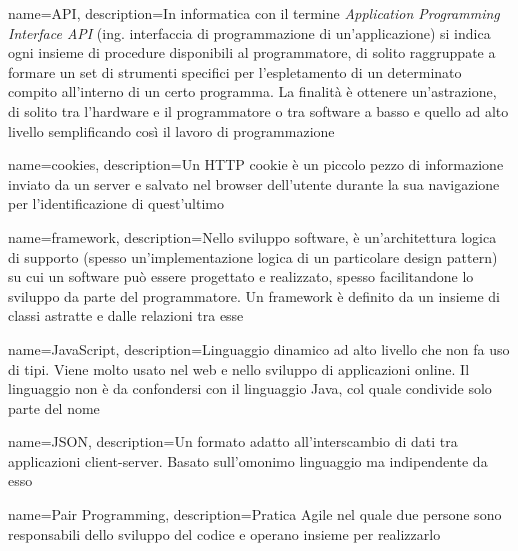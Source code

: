 
\renewcommand{\acronymname}{Acronimi e abbreviazioni}



{
    name=API,
    description={In informatica con il termine \emph{Application Programming Interface API} (ing. interfaccia di programmazione di un'applicazione) si indica ogni insieme di procedure disponibili al programmatore, di solito raggruppate a formare un set di strumenti specifici per l'espletamento di un determinato compito all'interno di un certo programma. La finalità è ottenere un'astrazione, di solito tra l'hardware e il programmatore o tra software a basso e quello ad alto livello semplificando così il lavoro di programmazione}
}

{
    name=cookies,
    description={Un HTTP cookie è un piccolo pezzo di informazione inviato da un server e salvato nel browser dell'utente durante la sua navigazione per l'identificazione di quest'ultimo}
}

{
    name=framework,
    description={Nello sviluppo software, è un'architettura logica di supporto (spesso un'implementazione logica di un particolare design pattern) su cui un software può essere progettato e realizzato, spesso facilitandone lo sviluppo da parte del programmatore.
    Un framework è definito da un insieme di classi astratte e dalle relazioni tra esse}
}

{
    name=JavaScript,
    description={Linguaggio dinamico ad alto livello che non fa uso di tipi. Viene molto usato nel web e nello sviluppo di applicazioni online. Il linguaggio non è da confondersi con il linguaggio Java, col quale condivide solo parte del nome}
}

{
    name=JSON,
    description={Un formato adatto all'interscambio di dati tra applicazioni client-server. Basato sull'omonimo linguaggio ma indipendente da esso}
}

{
    name=Pair Programming,
    description={Pratica Agile nel quale due persone sono responsabili dello sviluppo del codice e operano insieme per realizzarlo}
}

